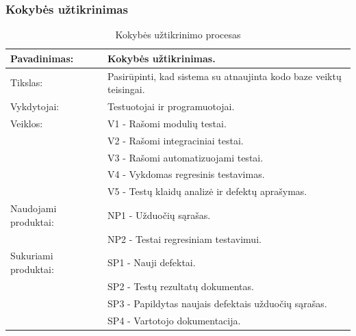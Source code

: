 \documentclass{VUMIFPSkursinis}
\begin{document}
	\subsubsection{Kokybės užtikrinimas}
	\begin{center}
		\begin{table}[ht]
			\caption{Kokybės užtikrinimo procesas}
			\begin{tabular}{ | l | l | }
				\hline
				Pavadinimas:		& Kokybės užtikrinimas.							\\ \hline
				Tikslas:		& Pasirūpinti, kad sistema su atnaujinta kodo baze veiktų teisingai.	\\ \hline
				Vykdytojai:		& Testuotojai ir programuotojai.					\\ \hline
				Veiklos:		& V1 - Rašomi modulių testai.						\\
							& V2 - Rašomi integraciniai testai.					\\
							& V3 - Rašomi automatizuojami testai.					\\
							& V4 - Vykdomas regresinis testavimas.					\\
							& V5 - Testų klaidų analizė ir defektų aprašymas.			\\ \hline
				Naudojami produktai:	& NP1 - Užduočių sąrašas. 						\\
							& NP2 - Testai regresiniam testavimui.					\\ \hline
				Sukuriami produktai:	& SP1 - Nauji defektai.							\\
							& SP2 - Testų rezultatų dokumentas.					\\
							& SP3 - Papildytas naujais defektais užduočių sąrašas.			\\ 
							& SP4 - Vartotojo dokumentacija. \\ \hline
			\end{tabular}
		\end{table}
	\end{center}
\end{document}

